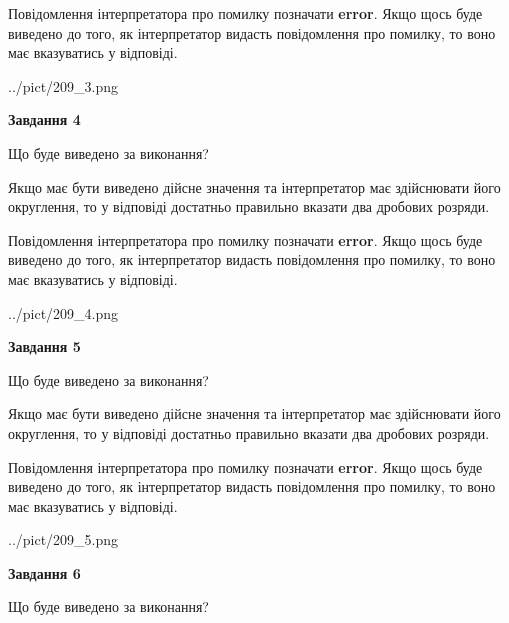 \documentclass[12pt, ukrainian]{article}
\begin{document}
{\begin {Large}
Повідомлення інтерпретатора про помилку позначати \textbf{error}.
Якщо щось буде виведено до того, як інтерпретатор видасть повідомлення про помилку, 
то воно має вказуватись у відповіді. \par

\begin{center}
	{../pict/209_3.png}
\end{center}
\newpage

{\begin {center}\textbf{Завдання 4}\end {center}}\par
Що буде виведено за виконання? \par

Якщо має бути виведено дійсне значення та інтерпретатор має здійснювати його округлення, 
то у відповіді достатньо правильно вказати два дробових розряди.

Повідомлення інтерпретатора про помилку позначати \textbf{error}.
Якщо щось буде виведено до того, як інтерпретатор видасть повідомлення про помилку, 
то воно має вказуватись у відповіді. \par

\begin{center}
	{../pict/209_4.png}
\end{center}
\newpage

{\begin {center}\textbf{Завдання 5}\end {center}}\par
Що буде виведено за виконання? \par

Якщо має бути виведено дійсне значення та інтерпретатор має здійснювати його округлення, 
то у відповіді достатньо правильно вказати два дробових розряди.

Повідомлення інтерпретатора про помилку позначати \textbf{error}.
Якщо щось буде виведено до того, як інтерпретатор видасть повідомлення про помилку, 
то воно має вказуватись у відповіді. \par

\begin{center}
	{../pict/209_5.png}
\end{center}
\newpage

{\begin {center}\textbf{Завдання 6}\end {center}}\par
Що буде виведено за виконання? \par


\end{Large}}
\end{document}

